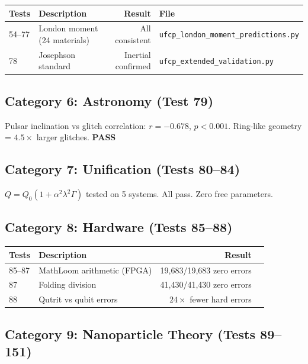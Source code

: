 \documentclass[11pt, a4paper]{article}
\newcommand{\pass}{\textcolor{nm-green}{\textbf{PASS}}}
\begin{document}
\begin{center}
\begin{tabular}{@{}llrl@{}}
\toprule
\textbf{Tests} & \textbf{Description} & \textbf{Result} &
\textbf{File} \\
\midrule
54--77 & London moment (24 materials) & All consistent &
  \texttt{ufcp\_london\_moment\_predictions.py} \\
78 & Josephson standard & Inertial confirmed &
  \texttt{ufcp\_extended\_validation.py} \\
\bottomrule
\end{tabular}
\end{center}

\subsection{Category 6: Astronomy (Test 79)}

Pulsar inclination vs glitch correlation: $r = -0.678$, $p < 0.001$.
Ring-like geometry = $4.5\times$ larger glitches. \pass

\subsection{Category 7: Unification (Tests 80--84)}

$Q = Q_0(1 + \alpha^2\lambda^2\Gamma)$ tested on 5 systems.
All pass. Zero free parameters.

\subsection{Category 8: Hardware (Tests 85--88)}

\begin{center}
\begin{tabular}{@{}llrl@{}}
\toprule
\textbf{Tests} & \textbf{Description} & \textbf{Result} \\
\midrule
85--87 & MathLoom arithmetic (FPGA) & 19,683/19,683 zero errors \\
87 & Folding division & 41,430/41,430 zero errors \\
88 & Qutrit vs qubit errors & $24\times$ fewer hard errors \\
\bottomrule
\end{tabular}
\end{center}

\subsection{Category 9: Nanoparticle Theory (Tests 89--151)}
\end{document}
